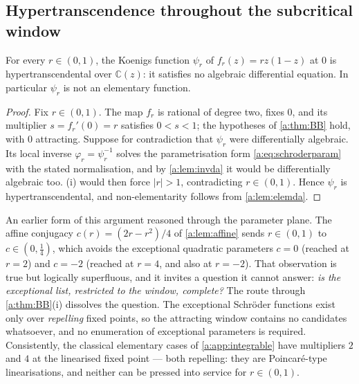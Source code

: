 \subsection{Hypertranscendence throughout the subcritical window}
\label{a:sec:htmain}

\begin{theorem}
\label{a:thm:ht}
For every $r\in(0,1)$, the Koenigs function $\psi_r$ of $f_r(z)=rz(1-z)$ at $0$ is
hypertranscendental over $\mathbb C(z)$: it satisfies no algebraic differential
equation. In particular $\psi_r$ is not an elementary function.
\end{theorem}

\begin{proof}
Fix $r\in(0,1)$. The map $f_r$ is rational of degree two, fixes $0$, and its
multiplier $s = f_r'(0) = r$ satisfies $0<s<1$; the hypotheses of \cref{a:thm:BB}
hold, with $0$ attracting. Suppose for contradiction that $\psi_r$ were
differentially algebraic. Its local inverse $\varphi_r = \psi_r^{-1}$ solves the
parametrisation form \cref{a:eq:schroderparam} with the stated normalisation, and by
\cref{a:lem:invda} it would be differentially algebraic too. (i)
would then force $|r|>1$, contradicting $r\in(0,1)$. Hence $\psi_r$ is
hypertranscendental, and non-elementarity follows from \cref{a:lem:elemda}.
\end{proof}

\begin{remark}
\label{a:rem:empty}
An earlier form of this argument reasoned through the parameter plane. The affine
conjugacy $c(r) = (2r-r^2)/4$ of \cref{a:lem:affine} sends $r\in(0,1)$ to
$c\in(0,\tfrac14)$, which avoids the exceptional quadratic parameters $c=0$
(reached at $r=2$) and $c=-2$ (reached at $r=4$, and also at $r=-2$). That
observation is true but logically superfluous, and it invites a question it cannot
answer: \emph{is the exceptional list, restricted to the window, complete?} The
route through \cref{a:thm:BB}(i) dissolves the question. The exceptional Schröder
functions exist only over \emph{repelling} fixed points, so the attracting window
contains no candidates whatsoever, and no enumeration of exceptional parameters is
required. Consistently, the classical elementary cases of \cref{a:app:integrable}
have multipliers $2$ and $4$ at the linearised fixed point --- both repelling: they
are Poincaré-type linearisations, and neither can be pressed into service for
$r\in(0,1)$.
\end{remark}

